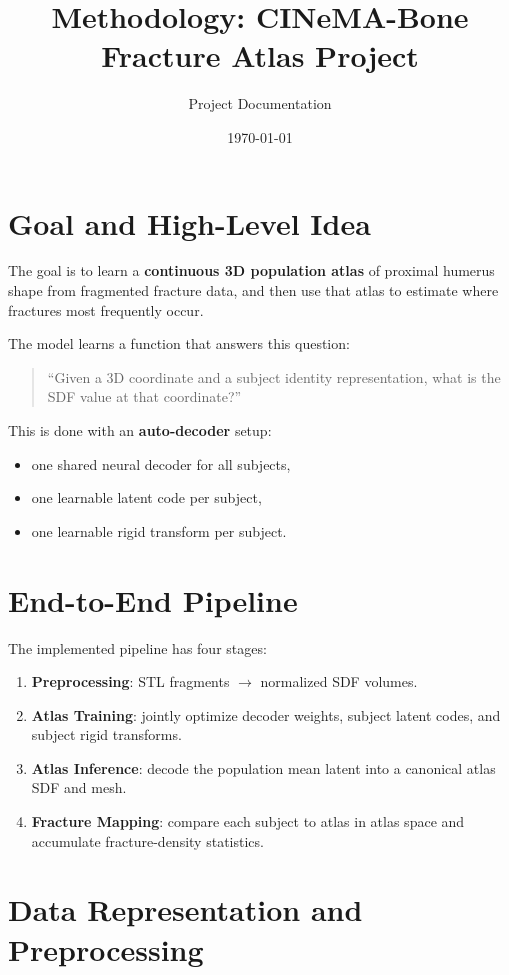 ﻿\documentclass[11pt]{article}
\title{Methodology: CINeMA-Bone Fracture Atlas Project}
\author{Project Documentation}
\date{\today}
\begin{document}
\maketitle
\tableofcontents

\section{Goal and High-Level Idea}
The goal is to learn a \textbf{continuous 3D population atlas} of proximal humerus shape from fragmented fracture data, and then use that atlas to estimate where fractures most frequently occur.

The model learns a function that answers this question:
\begin{quote}
``Given a 3D coordinate and a subject identity representation, what is the SDF value at that coordinate?''
\end{quote}

This is done with an \textbf{auto-decoder} setup:
\begin{itemize}[leftmargin=*]
    \item one shared neural decoder for all subjects,
    \item one learnable latent code per subject,
    \item one learnable rigid transform per subject.
\end{itemize}

\section{End-to-End Pipeline}
The implemented pipeline has four stages:
\begin{enumerate}[leftmargin=*]
    \item \textbf{Preprocessing}: STL fragments $\rightarrow$ normalized SDF volumes.
    \item \textbf{Atlas Training}: jointly optimize decoder weights, subject latent codes, and subject rigid transforms.
    \item \textbf{Atlas Inference}: decode the population mean latent into a canonical atlas SDF and mesh.
    \item \textbf{Fracture Mapping}: compare each subject to atlas in atlas space and accumulate fracture-density statistics.
\end{enumerate}

\section{Data Representation and Preprocessing}
\end{document}
